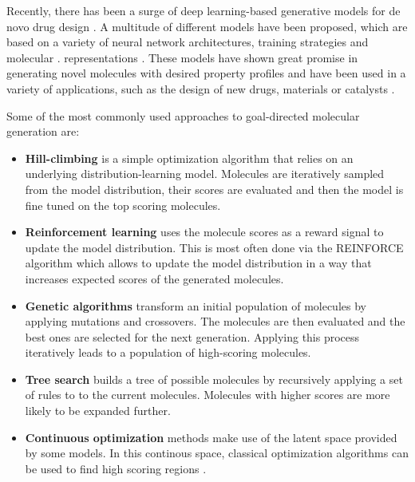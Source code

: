 Recently, there has been a surge of deep learning-based generative models for de novo drug
design \citep{eltonDeepLearningMolecular2019,sanchez-lengelingInverseMolecularDesign2018,duMachineLearningaidedGenerative2024}. A multitude of different models have been proposed,
which are based on a variety of neural network architectures, training strategies and molecular
\citep{eltonDeepLearningMolecular2019,sanchez-lengelingInverseMolecularDesign2018}.
representations \citep{eltonDeepLearningMolecular2019,sanchez-lengelingInverseMolecularDesign2018,pangDeepGenerativeModels2024,duMachineLearningaidedGenerative2024}.
These models have shown great promise in generating novel molecules with desired property profiles
and have been used in a variety of applications, such as the design of new drugs, materials or
catalysts \citep{todo}.

Some of the most commonly used approaches to goal-directed molecular generation are:
\begin{itemize}
      \item \textbf{Hill-climbing}
            \citep{seglerGeneratingFocusedMolecule2018,xieMARSMarkovMolecular2021} is a simple
            optimization algorithm that relies on an underlying distribution-learning model.
            Molecules are iteratively sampled from the model distribution, their scores are
            evaluated and then the model is fine tuned on the top scoring molecules.
      \item \textbf{Reinforcement learning} uses the molecule scores as a reward signal to update the
            model distribution. This is most often done via the REINFORCE algorithm\citep{williamsSimpleStatisticalGradientfollowing1992} which allows
            to update the model distribution in a way that increases expected scores of the generated
            molecules.
      \item \textbf{Genetic algorithms} transform an initial population of molecules by applying
            mutations and crossovers. The molecules are then evaluated and the best ones are selected for
            the next generation. Applying this process iteratively leads to a population of high-scoring
            molecules.
      \item \textbf{Tree search} builds a tree of possible molecules by recursively applying a set of rules to
            to the current molecules. Molecules with higher scores are more likely to be expanded further.
      \item \textbf{Continuous optimization} methods make use of the latent space provided by some models.
            In this continous space, classical optimization algorithms can be used to find high scoring regions
            \citep{winterEfficientMultiobjectiveMolecular2019,gomez-bombarelliAutomaticChemicalDesign2018}.
\end{itemize}

